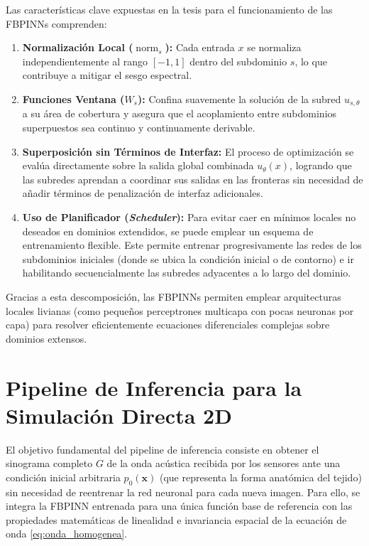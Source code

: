 Las características clave expuestas en la tesis para el funcionamiento de las FBPINNs comprenden:
\begin{enumerate}
    \item \textbf{Normalización Local ($\operatorname{norm}_s$):} Cada entrada $x$ se normaliza independientemente al rango $[-1, 1]$ dentro del subdominio $s$, lo que contribuye a mitigar el sesgo espectral.
    \item \textbf{Funciones Ventana ($W_s$):} Confina suavemente la solución de la subred $u_{s,\theta}$ a su área de cobertura y asegura que el acoplamiento entre subdominios superpuestos sea continuo y continuamente derivable.
    \item \textbf{Superposición sin Términos de Interfaz:} El proceso de optimización se evalúa directamente sobre la salida global combinada $u_\theta(x)$, logrando que las subredes aprendan a coordinar sus salidas en las fronteras sin necesidad de añadir términos de penalización de interfaz adicionales.
    \item \textbf{Uso de Planificador (\textit{Scheduler}):} Para evitar caer en mínimos locales no deseados en dominios extendidos, se puede emplear un esquema de entrenamiento flexible. Este permite entrenar progresivamente las redes de los subdominios iniciales (donde se ubica la condición inicial o de contorno) e ir habilitando secuencialmente las subredes adyacentes a lo largo del dominio.
\end{enumerate}

Gracias a esta descomposición, las FBPINNs permiten emplear arquitecturas locales livianas (como pequeños perceptrones multicapa con pocas neuronas por capa) para resolver eficientemente ecuaciones diferenciales complejas sobre dominios extensos.





\section{Pipeline de Inferencia para la Simulación Directa 2D}

El objetivo fundamental del pipeline de inferencia consiste en obtener el sinograma completo $G$ de la onda acústica recibida por los sensores ante una condición inicial arbitraria $p_0(\mathbf{x})$ (que representa la forma anatómica del tejido) sin necesidad de reentrenar la red neuronal para cada nueva imagen.
 Para ello, se integra la FBPINN entrenada para una única función base de referencia con las propiedades matemáticas de linealidad e invariancia espacial de la ecuación de onda \ref{eq:onda_homogenea}.

